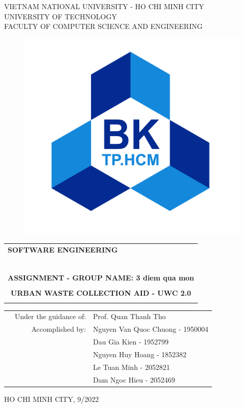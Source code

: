 \documentclass[a4paper]{article}
\begin{document}
\begin{titlepage}
\begin{center}
VIETNAM NATIONAL UNIVERSITY - HO CHI MINH CITY \\
UNIVERSITY OF TECHNOLOGY \\
FACULTY OF COMPUTER SCIENCE AND ENGINEERING 
\end{center}

\vspace{1cm}

\begin{figure}[H]
\begin{center}
\includegraphics[width=0.3\linewidth]{hcmut.png}
\end{center}
\end{figure}

\vspace{1cm}


\begin{center}
\begin{tabular}{c}
\multicolumn{1}{l}{\textbf{{\Large SOFTWARE ENGINEERING}}}\\
~~\\
\hline
\\
\multicolumn{1}{l}{\textbf{{\large ASSIGNMENT - GROUP NAME: 3 diem qua mon}}}\\
\\
\textbf{{\LARGE URBAN WASTE COLLECTION AID - UWC 2.0}}\\
\\
\hline
\end{tabular}
\end{center}

\vspace{1cm}

\begin{table}[h]
\begin{tabular}{rrl}
\hspace{5 cm} & Under the guidance of: & Prof. Quan Thanh Tho\\
& Accomplished by: & Nguyen Van Quoc Chuong - 1950004 \\
& & Dau Gia Kien - 1952799 \\
& & Nguyen Huy Hoang - 1852382 \\
& & Le Tuan Minh - 2052821 \\
& & Dam Ngoc Hieu - 2052469\\
\end{tabular}
\end{table}

\begin{center}
{\footnotesize HO CHI MINH CITY, 9/2022}
\end{center}
\end{titlepage}
\end{document}
